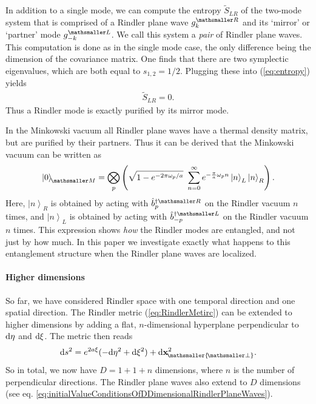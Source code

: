 \documentclass[11pt, a4paper]{article}
\def\bx{{\bf x}}
\newcommand{\om}{\omega}
\newcommand{\ket}[1]{\left| #1 \right>} %
\newcommand{\ketmink}{\ket{0}_{\!\ms M}}
\let\perptmp\perp
\renewcommand{\perp}{{\! \mathsmaller{\perptmp}}}
\newcommand{\ms}{\mathsmaller}
\newcommand{\mrm}{\mathrm}
\begin{document}
In addition to a single mode, we can compute the entropy $\widetilde S_{LR}$ of the two-mode system that is comprised of a Rindler plane wave $g_k^{\ms R}$ and its `mirror' or `partner' mode $g_{-k}^{\ms L}$. We call this system a \emph{pair} of Rindler plane waves. This computation is done as in the single mode case, the only difference being the dimension of the covariance matrix. One finds that there are two symplectic eigenvalues, which are both equal to $s_{1,2}=1/2$. Plugging these into (\ref{eq:entropy}) yields 
\begin{align}
\label{eq:entropyOfAPairOfRindlerPlaneWaves}
\widetilde S_{LR}=0.
\end{align}
Thus a Rindler mode is exactly purified by its mirror mode. 

In the Minkowski vacuum all Rindler plane waves have a thermal density matrix, but are purified by their partners. Thus it can be derived that the Minkowski vacuum can be written as \cite{Harlow, Kattemolle}
\begin{align}
	\label{eq:minkowskiVacuumInTermsOfRindlerModes}
\ketmink=\bigotimes_p\left(\sqrt{{1-e^{-2\pi\om_p/a}}}\ \sum_{n=0}^\infty e^{-\frac{\pi }{a}\om_p n}\ket{n}_L\ket{n}_R\right).	
\end{align}
Here, $\ket{n}_R$ is obtained by acting with $\hat b_p^{\dagger\ms R}$ on the Rindler vacuum $n$ times, and  $\ket{n}_L$ is obtained by acting with $\hat b_{-p}^{\dagger \ms L}$ on the Rindler vacuum $n$ times. This expression shows \emph{how} the Rindler modes are entangled, and not just by how much. In this paper we investigate exactly what happens to this entanglement structure when the Rindler plane waves are localized.

\paragraph{Higher dimensions} So far, we have considered Rindler space with one temporal direction and one spatial direction. The Rindler metric (\ref{eq:RindlerMetirc}) can be extended to higher dimensions by adding a flat, $n$-dimensional hyperplane perpendicular to $\rm d \eta $ and $\rm d\xi$. The metric then reads
\begin{align*}
	\mrm ds^2=e^{2a\xi}(-\mrm d\eta^2+\mrm d\xi^2)+\mrm d\bx_\perp^2.
\end{align*}
So in total, we now have $D=1+1+n$ dimensions, where $n$ is the number of perpendicular directions. The Rindler plane waves also extend to $D$ dimensions (see eq. \ref{eq:initialValueConditionsOfDDimensionalRindlerPlaneWaves}). 
\end{document}
